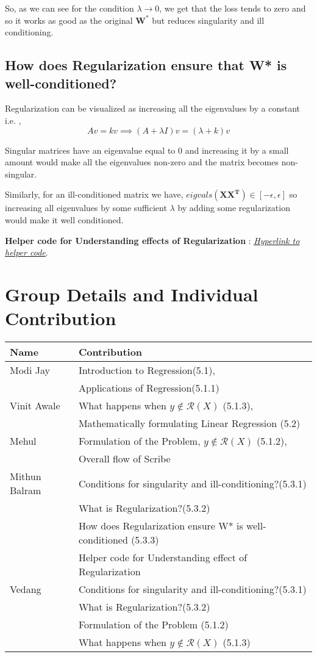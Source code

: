 \documentclass[11pt]{article}
\begin{document}
So, as we can see for the condition $\lambda \rightarrow 0$, we get that the loss tends to zero and so it works as good as the original $\mathbf{W^*}$ but reduces singularity and ill conditioning. 

\subsection{How does Regularization ensure that \textbf{W*} is well-conditioned?}
Regularization can be visualized as increasing all the eigenvalues by a constant i.e. ,
\begin{equation}
    Av = kv \implies (A + \lambda I)v = (\lambda + k)v
\end{equation}

Singular matrices have an eigenvalue equal to 0 and increasing it by a small amount would make all the eigenvalues non-zero and  the matrix becomes non-singular.

Similarly, for an ill-conditioned matrix we have, ${eigvals(\mathbf{X X^T}) \in [-\epsilon,\epsilon]}$ so increasing all eigenvalues by some sufficient ${\lambda}$ by adding some regularization would make it well conditioned.


\textbf{Helper code for Understanding effects of Regularization} : \href{https://colab.research.google.com/drive/1BQGdsfARX5V030_1HJgdRMTezbz7ZbDp?usp=sharing}{\underline{\textit{Hyperlink to helper code}}}.



\section{Group Details and Individual Contribution}
\centering
\begin{tabular}{ |l|l|  }
 \hline
\textbf{Name} & \textbf{Contribution}
 \\
 \hline
 Modi Jay & Introduction to Regression(5.1), \\ &Applications of Regression(5.1.1)\\
 \hline
 Vinit Awale & What happens when $y \not \in \mathcal{R}(X)$ (5.1.3), \\    &Mathematically formulating Linear Regression (5.2) \\
 \hline
 Mehul & Formulation of the Problem, $y \not \in \mathcal{R}(X)$ (5.1.2),\\      &Overall flow of Scribe\\ 
 \hline
 Mithun Balram &Conditions for singularity and ill-conditioning?(5.3.1)\\
 &What is Regularization?(5.3.2)\\
 &How does Regularization ensure W* is well-conditioned (5.3.3)\\
 & Helper code for Understanding effect of Regularization \\
 \hline
 Vedang &Conditions for singularity and ill-conditioning?(5.3.1)\\ &What is Regularization?(5.3.2)\\ &Formulation of the Problem (5.1.2) \\&What happens when $y \not \in \mathcal{R}(X)$ (5.1.3)\\
 \hline
\end{tabular}
\end{document}

